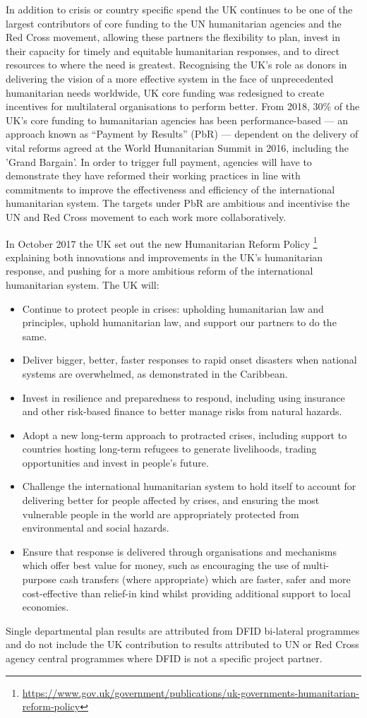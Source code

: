 In addition to crisis or country specific spend the UK continues to be one of the largest contributors of core funding to the UN humanitarian agencies and the Red Cross movement, allowing these partners the flexibility to plan, invest in their capacity for timely and equitable humanitarian responses, and to direct resources to where the need is greatest. %
Recognising the UK's role as donors in delivering the vision of a more effective system in the face of unprecedented humanitarian needs worldwide, UK core funding was redesigned to create incentives for multilateral organisations to perform better. %
From 2018, 30\% of the UK's core funding to humanitarian agencies has been performance-based --- an approach known as ``Payment by Results'' (PbR) --- dependent on the delivery of vital reforms agreed at the World Humanitarian Summit in 2016, including the 'Grand Bargain'. %
In order to trigger full payment, agencies will have to demonstrate they have reformed their working practices in line with commitments to improve the effectiveness and efficiency of the international humanitarian system. %
The targets under PbR are ambitious and incentivise the UN and Red Cross movement to each work more collaboratively. %

In October 2017 the UK set out the new Humanitarian Reform Policy \footnote{\href{https://www.gov.uk/government/publications/uk-governments-humanitarian-reform-policy}{https://www.gov.uk/government/publications/uk-governments-humanitarian-reform-policy}} explaining both innovations and improvements in the UK's humanitarian response, and pushing for a more ambitious reform of the international humanitarian system. %
The UK will:
\begin{itemize}
\item Continue to protect people in crises: upholding humanitarian law and principles, uphold humanitarian law, and support our partners to do the same.
\item Deliver bigger, better, faster responses to rapid onset disasters when national systems are overwhelmed, as demonstrated in the Caribbean.
\item Invest in resilience and preparedness to respond, including using insurance and other risk-based finance to better manage risks from natural hazards.
\item Adopt a new long-term approach to protracted crises, including support to countries hosting long-term refugees to generate livelihoods, trading opportunities and invest in people’s future.
\item Challenge the international humanitarian system to hold itself to account for delivering better for people affected by crises, and ensuring the most vulnerable people in the world are appropriately protected from environmental and social hazards.
\item Ensure that response is delivered through organisations and mechanisms which offer best value for money, such as encouraging the use of multi-purpose cash transfers (where appropriate) which are faster, safer and more cost-effective than relief-in kind whilst providing additional support to local economies.
\end{itemize}

Single departmental plan results are attributed from DFID bi-lateral programmes and do not include the UK contribution to results attributed to UN or Red Cross agency central programmes where DFID is not a specific project partner. %


\newpage
